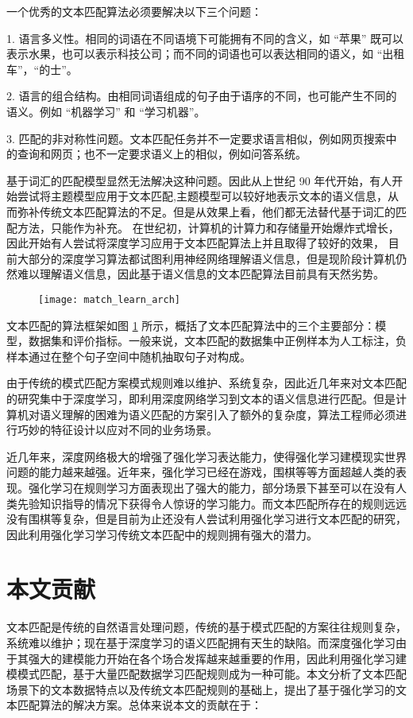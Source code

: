 一个优秀的文本匹配算法必须要解决以下三个问题：

1. 语言多义性。相同的词语在不同语境下可能拥有不同的含义，如 “苹果” 既可以表示水果，也可以表示科技公司；而不同的词语也可以表达相同的语义，如 “出租车”，“的士”。

2. 语言的组合结构。由相同词语组成的句子由于语序的不同，也可能产生不同的语义。例如 “机器学习” 和 “学习机器”。

3. 匹配的非对称性问题。文本匹配任务并不一定要求语言相似，例如网页搜索中的查询和网页；也不一定要求语义上的相似，例如问答系统。

基于词汇的匹配模型显然无法解决这种问题。因此从上世纪 90 年代开始，有人开始尝试将主题模型应用于文本匹配,主题模型可以较好地表示文本的语义信息，从而弥补传统文本匹配算法的不足。但是从效果上看，他们都无法替代基于词汇的匹配方法，只能作为补充。
在世纪初，计算机的计算力和存储量开始爆炸式增长，因此开始有人尝试将深度学习应用于文本匹配算法上并且取得了较好的效果，
目前大部分的深度学习算法都试图利用神经网络理解语义信息，但是现阶段计算机仍然难以理解语义信息，因此基于语义信息的文本匹配算法目前具有天然劣势。

\begin{figure}[!htbp]
    \centering
    \texttt{[image: match\_learn\_arch]}
    \label{fig:match_learn_arch}
\end{figure}

文本匹配的算法框架如图 \ref{fig:match_learn_arch} 所示，概括了文本匹配算法中的三个主要部分：模型，数据集和评价指标。一般来说，文本匹配的数据集中正例样本为人工标注，负样本通过在整个句子空间中随机抽取句子对构成。

由于传统的模式匹配方案模式规则难以维护、系统复杂，因此近几年来对文本匹配的研究集中于深度学习，即利用深度网络学习到文本的语义信息进行匹配。但是计算机对语义理解的困难为语义匹配的方案引入了额外的复杂度，算法工程师必须进行巧妙的特征设计以应对不同的业务场景。

近几年来，深度网络极大的增强了强化学习表达能力，使得强化学习建模现实世界问题的能力越来越强。近年来，强化学习已经在游戏，围棋等等方面超越人类的表现。强化学习在规则学习方面表现出了强大的能力，部分场景下甚至可以在没有人类先验知识指导的情况下获得令人惊讶的学习能力。而文本匹配所存在的规则远远没有围棋等复杂，但是目前为止还没有人尝试利用强化学习进行文本匹配的研究，因此利用强化学习学习传统文本匹配中的规则拥有强大的潜力。

\section{本文贡献}
文本匹配是传统的自然语言处理问题，传统的基于模式匹配的方案往往规则复杂，系统难以维护；现在基于深度学习的语义匹配拥有天生的缺陷。而深度强化学习由于其强大的建模能力开始在各个场合发挥越来越重要的作用，因此利用强化学习建模模式匹配，基于大量匹配数据学习匹配规则成为一种可能。本文分析了文本匹配场景下的文本数据特点以及传统文本匹配规则的基础上，提出了基于强化学习的文本匹配算法的解决方案。总体来说本文的贡献在于：

